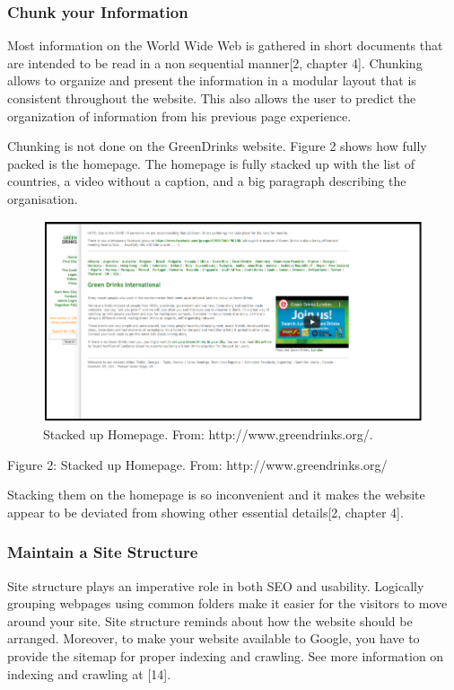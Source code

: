 \documentclass[12pt]{article}
\begin{document}
 \subsubsection*{Chunk your Information}
Most information on the World Wide Web is gathered in short documents that are intended to be read in a non sequential manner[2, chapter 4]. Chunking allows to organize and present the information in a modular layout that is consistent throughout the website.  This also allows the user to predict the organization of information from his previous page experience. 

Chunking is not done on the GreenDrinks website.  Figure 2 shows how fully packed is the homepage. The homepage is fully stacked up with the list of countries, a video without a caption, and a big paragraph describing the organisation.


\begin{figure}[ht]
\centering
\includegraphics[width=1.0\textwidth]{f2}
\caption[Stacked up Homepage]{Stacked up Homepage. From: http://www.greendrinks.org/\footnotemark.}
\end{figure}

Figure 2: Stacked up Homepage. From: http://www.greendrinks.org/

Stacking them on the homepage is so inconvenient and it makes the website appear to be deviated from showing other essential details[2, chapter 4].

 \subsubsection*{Maintain a Site Structure}
Site structure plays an imperative role in both SEO and usability.  Logically grouping webpages using common folders make it easier for the visitors to move around your site. Site structure reminds about how the website should be arranged.  Moreover, to make your website available to Google, you have to provide the sitemap for proper indexing and crawling. See more information on indexing and crawling at [14].
\end{document}

